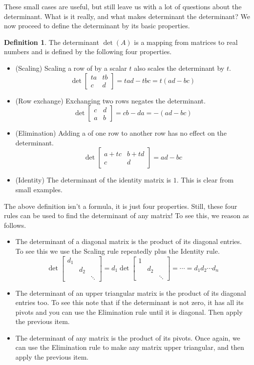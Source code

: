 \documentclass[11pt,oneside]{amsbook}
\theoremstyle{definition}
\theoremstyle{plain}
\theoremstyle{definition}
\newtheorem{definition}[theorem]{Definition}
\theoremstyle{remark}
\numberwithin{equation}{section}
\numberwithin{figure}{section}
\begin{document}
These small cases are useful, but still leave us with a lot of questions about the determinant. What is it really, and what makes determinant the determinant? We now proceed to define the determinant by its basic properties.

\begin{definition}
  The determinant $\det(A)$ is a mapping from matrices to real numbers and is defined by the following four properties.
  \begin{itemize}
    \item (Scaling) Scaling a row of by a scalar $t$ also scales the determinant by $t$.
    \[\det\begin{bmatrix}ta&tb\\c&d\end{bmatrix}
      =tad-tbc=t(ad-bc)
    \]
    \item (Row exchange) Exchanging two rows negates the determinant.
    \[\det\begin{bmatrix}c&d\\a&b\end{bmatrix}
      =cb-da=-(ad-bc)
    \]
    \item (Elimination) Adding a of one row to another row has no effect on the determinant.
    \[\det\begin{bmatrix}a+tc&b+td\\c&d\end{bmatrix}
      =ad-bc
    \]
    \item (Identity) The determinant of the identity matrix is $1$. This is clear from small examples.
  \end{itemize}
\end{definition}

The above definition isn't a formula, it is just four properties. Still, these four rules can be used to find the determinant of any matrix! To see this, we reason as follows.

\begin{itemize}
  \item The determinant of a diagonal matrix is the product of its diagonal entries. To see this we use the Scaling rule repeatedly plus the Identity rule.
    \[\det\begin{bmatrix}d_1&&\\&d_2&\\&&\ddots\end{bmatrix}
      =d_1\det\begin{bmatrix}1&&\\&d_2&\\&&\ddots\end{bmatrix}
      =\cdots=d_1d_2\cdots d_n
    \]
  \item The determinant of an upper triangular matrix is the product of its diagonal entries too. To see this note that if the determinant is not zero, it has all its pivots and you can use the Elimination rule until it is diagonal. Then apply the previous item.
  \item The determinant of any matrix is the product of its pivots. Once again, we can use the Elimination rule to make any matrix upper triangular, and then apply the previous item.
\end{itemize}
\end{document}
